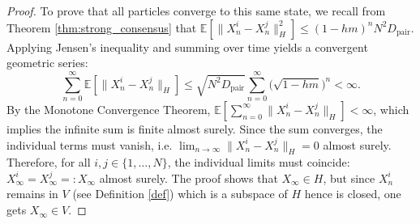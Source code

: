 \documentclass[12pt]{amsart}
\numberwithin{equation}{section}
\newtheorem{remark}[theorem]{Remark}
\begin{document}
\begin{proof}
To prove that all particles converge to this same state, we recall from Theorem \ref{thm:strong_consensus} that $\mathbb{E}[\|X_n^i - X_n^j\|_H^2] \le (1-hm)^n N^2D_{\text{pair}}$. Applying Jensen's inequality and summing over time yields a convergent geometric series:
\begin{equation*}
    \sum_{n=0}^\infty \mathbb{E}[\|X_n^i - X_n^j\|_H] \le \sqrt{N^2D_{\text{pair}}} \sum_{n=0}^\infty \big(\sqrt{1-hm}\big)^n < \infty.
\end{equation*}
By the Monotone Convergence Theorem, $\mathbb{E} \left[ \sum_{n=0}^\infty \|X_n^i - X_n^j\|_H \right] < \infty$, which implies the infinite sum is finite almost surely. Since the sum converges, the individual terms must vanish, i.e. $\lim_{n \to \infty} \|X_n^i - X_n^j\|_H = 0$ almost surely. Therefore, for all $i, j \in \{1, \dots, N\}$, the individual limits must coincide: $X_\infty^i = X_\infty^j =: X_\infty$ almost surely. The proof shows that $X_{\infty}\in H$, but since $X^{i}_{n}$ remains in $V$ (see Definition \ref{def}) which is a subspace of $H$ hence is closed, one gets $X_{\infty}\in V$.
\end{proof}


\end{document}
